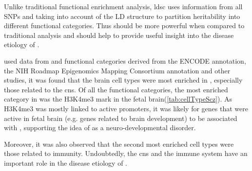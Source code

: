	Unlike traditional functional enrichment analysis, \gls{ldsc} uses information from all \glspl{SNP} and taking into account of the \gls{LD} structure to partition heritability into different functional categories. 
	Thus should be more powerful when compared to traditional analysis and should help to provide useful insight into the disease etiology of .

	\citet{Finucane2015} used data from \citet{Ripke2014} and functional categories derived from the ENCODE annotation\citep{ENCODEProjectConsortium2012}, the NIH Roadmap Epigenomics Mapping Consortium annotation\citep{Bernstein2010} and other studies\citep{Finucane2015}, it was found that the brain cell types were most enriched in , especially those related to the \gls{cns}.
	Of all the functional categories, the most enriched category in  was the H3K4me3 mark in the fetal brain(\cref{tab:cellTypeScz}). 
	As H3K4me3 was mostly linked to active promoters, it was likely for genes that were active in fetal brain (e.g. genes related to brain development) to be associated with , supporting the idea of  as a neuro-developmental disorder. 
	
	Moreover, it was also observed that the second most enriched cell types were those related to immunity.
	Undoubtedly, the \gls{cns} and the immune system have an important role in the disease etiology of . 

